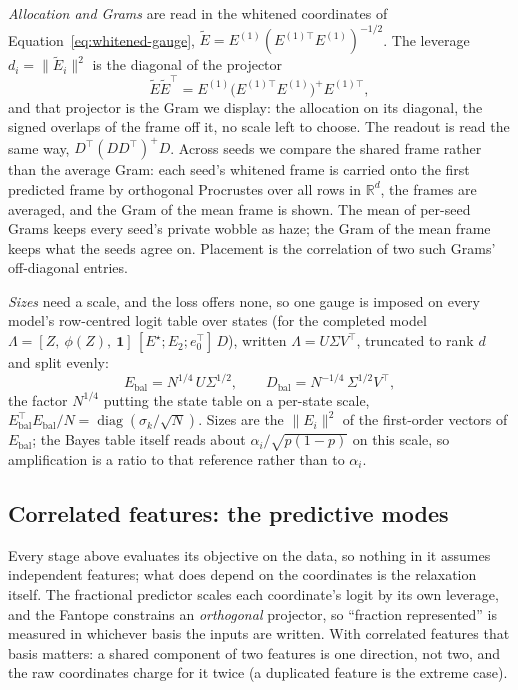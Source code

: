 \emph{Allocation and Grams} are read in the whitened coordinates of
Equation~\eqref{eq:whitened-gauge}, \(\tilde E=E^{(1)}(E^{(1)\top}E^{(1)})^{-1/2}\).
The leverage \(d_i=\|\tilde E_i\|^2\) is the diagonal of the projector
\begin{equation}
\boxed{
\tilde E\tilde E^\top
=
E^{(1)}\big(E^{(1)\top}E^{(1)}\big)^{+}E^{(1)\top},
}
\label{eq:whitened-grams}
\end{equation}
and that projector is the Gram we display: the allocation on its diagonal, the signed
overlaps of the frame off it, no scale left to choose. The readout is read the same way,
\(D^\top(DD^\top)^{+}D\). Across seeds we compare the shared frame rather than the average
Gram: each seed's whitened frame is carried onto the first predicted frame by orthogonal
Procrustes over all rows in \(\mathbb R^d\), the frames are averaged, and the Gram of the
mean frame is shown. The mean of per-seed Grams keeps every seed's private wobble as
haze; the Gram of the mean frame keeps what the seeds agree on. Placement is the
correlation of two such Grams' off-diagonal entries.

\emph{Sizes} need a scale, and the loss offers none, so one gauge is imposed on every
model's row-centred logit table over states (for the completed model
\(\Lambda=[Z,\ \phi(Z),\ \mathbf 1]\,[E^\star;E_2;e_0^\top]\,D\)), written
\(\Lambda=U\Sigma V^\top\), truncated to rank \(d\) and split evenly:
\begin{equation}
\boxed{
E_{\mathrm{bal}}
=
N^{1/4}\,U\Sigma^{1/2},
\qquad
D_{\mathrm{bal}}
=
N^{-1/4}\,\Sigma^{1/2}V^\top,
}
\label{eq:balanced-factorization}
\end{equation}
the factor \(N^{1/4}\) putting the state table on a per-state scale,
\(E_{\mathrm{bal}}^\top E_{\mathrm{bal}}/N=\operatorname{diag}(\sigma_k/\sqrt N)\).
Sizes are the \(\|E_i\|^2\) of the first-order vectors of \(E_{\mathrm{bal}}\); the Bayes
table itself reads about \(\alpha_i/\sqrt{p(1-p)}\) on this scale, so amplification is a
ratio to that reference rather than to \(\alpha_i\).

\subsection{Correlated features: the predictive modes}
\label{sec:modes}

Every stage above evaluates its objective on the data, so nothing in it assumes
independent features; what does depend on the coordinates is the relaxation itself.
The fractional predictor scales each coordinate's logit by its own leverage, and the
Fantope constrains an \emph{orthogonal} projector, so ``fraction represented'' is
measured in whichever basis the inputs are written. With correlated features that
basis matters: a shared component of two features is one direction, not two, and the
raw coordinates charge for it twice (a duplicated feature is the extreme case).


